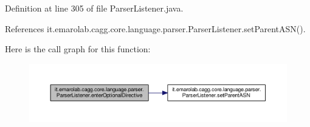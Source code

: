 Definition at line 305 of file Parser\-Listener.\-java.



References it.\-emarolab.\-cagg.\-core.\-language.\-parser.\-Parser\-Listener.\-set\-Parent\-A\-S\-N().



Here is the call graph for this function\-:\nopagebreak
\begin{figure}[H]
\begin{center}
\leavevmode
\includegraphics[width=350pt]{classit_1_1emarolab_1_1cagg_1_1core_1_1language_1_1parser_1_1ParserListener_a77953040a7c457024508d8529003d882_cgraph}
\end{center}
\end{figure}


